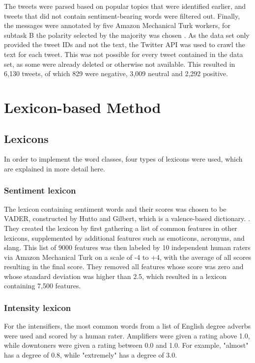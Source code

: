 The tweets were parsed based on popular topics that were identified earlier, and tweets that did not contain sentiment-bearing words were filtered out. Finally, the messages were annotated by five Amazon Mechanical Turk workers, for subtask B the polarity selected by the majority was chosen \cite{nakov-etal-2013-semeval}. As the data set only provided the tweet IDs and not the text, the Twitter API was used to crawl the text for each tweet. This was not possible for every tweet contained in the data set, as some were already deleted or otherwise not available. This resulted in 6,130 tweets, of which 829 were negative, 3,009 neutral and 2,292 positive.

\section{Lexicon-based Method}

\subsection{Lexicons}
In order to implement the word classes, four types of lexicons were used, which are explained in more detail here.

\subsubsection{Sentiment lexicon}
The lexicon containing sentiment words and their scores was chosen to be VADER, constructed by Hutto and Gilbert, which is a valence-based dictionary. \cite{DBLP:conf/icwsm/HuttoG14}. They created the lexicon by first gathering a list of common features in other lexicons, supplemented by additional features such as emoticons, acronyms, and slang. This list of 9000 features was then labeled by 10 independent human raters via Amazon Mechanical Turk on a scale of -4 to +4, with the average of all scores resulting in the final score. They removed all features whose score was zero and whose standard deviation was higher than 2.5, which resulted in a lexicon containing 7,500 features.

\subsubsection{Intensity lexicon}
For the intensifiers, the most common words from a list of English degree adverbs \cite{wiki:adverbs} were used and scored by a human rater. Amplifiers were given a rating above 1.0, while downtoners were given a rating between 0.0 and 1.0. For example, "almost" has a degree of 0.8, while "extremely" has a degree of 3.0.


